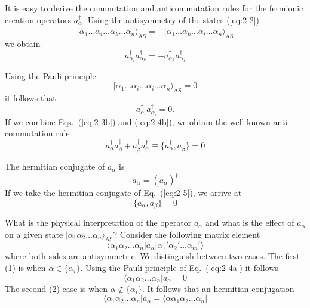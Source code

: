 It is easy to derive the commutation and anticommutation rules  for the fermionic creation operators 
$a_\alpha^{\dagger}$. Using the antisymmetry of the states 
(\ref{eq:2-2})
\begin{equation}
	|\alpha_1\dots \alpha_i\dots \alpha_k\dots \alpha_n\rangle_{\mathrm{AS}} = 
		- |\alpha_1\dots \alpha_k\dots \alpha_i\dots \alpha_n\rangle_{\mathrm{AS}} \label{eq:2-3a}
\end{equation}
we obtain
\begin{equation}
	 a_{\alpha_i}^{\dagger}  a_{\alpha_k}^{\dagger} = - a_{\alpha_k}^{\dagger} a_{\alpha_i}^{\dagger} \label{eq:2-3b}
\end{equation}

Using the Pauli principle
\begin{equation}
	|\alpha_1\dots \alpha_i\dots \alpha_i\dots \alpha_n\rangle_{\mathrm{AS}} = 0 \label{eq:2-4a}
\end{equation}
it follows that
\begin{equation}
	a_{\alpha_i}^{\dagger}  a_{\alpha_i}^{\dagger} = 0. \label{eq:2-4b}
\end{equation}
If we combine Eqs.~(\ref{eq:2-3b}) and (\ref{eq:2-4b}), we obtain the well-known anti-commutation rule
\begin{equation}
	a_{\alpha}^{\dagger}  a_{\beta}^{\dagger} + a_{\beta}^{\dagger}  a_{\alpha}^{\dagger} \equiv 
		\{a_{\alpha}^{\dagger},a_{\beta}^{\dagger}\} = 0 \label{eq:2-5}
\end{equation}

The hermitian conjugate  of $a_\alpha^{\dagger}$ is
\begin{equation}
	a_{\alpha} = ( a_{\alpha}^{\dagger} )^{\dagger} \label{eq:2-6}
\end{equation}
If we take the hermitian conjugate of Eq.~(\ref{eq:2-5}), we arrive at 
\begin{equation}
	\{a_{\alpha},a_{\beta}\} = 0 \label{eq:2-7}
\end{equation}

What is the physical interpretation of the operator $a_\alpha$ and what is the effect of 
$a_\alpha$ on a given state $|\alpha_1\alpha_2\dots\alpha_n\rangle_{\mathrm{AS}}$? 
Consider the following matrix element
\begin{equation}
	\langle\alpha_1\alpha_2 \dots \alpha_n|a_\alpha|\alpha_1'\alpha_2' \dots \alpha_m'\rangle \label{eq:2-8}
\end{equation}
where both sides are antisymmetric. We  distinguish between two cases. The first (1) is when
$\alpha \in \{\alpha_i\}$. Using the Pauli principle of Eq.~(\ref{eq:2-4a}) it follows
\begin{equation}
		\langle\alpha_1\alpha_2 \dots \alpha_n|a_\alpha = 0 \label{eq:2-9a}
\end{equation}
The second (2) case is when $\alpha \notin \{\alpha_i\}$. It follows that an hermitian conjugation
\begin{equation}
		\langle \alpha_1\alpha_2 \dots \alpha_n|a_\alpha = \langle\alpha\alpha_1\alpha_2 \dots \alpha_n|  \label{eq:2-9b}
\end{equation}

